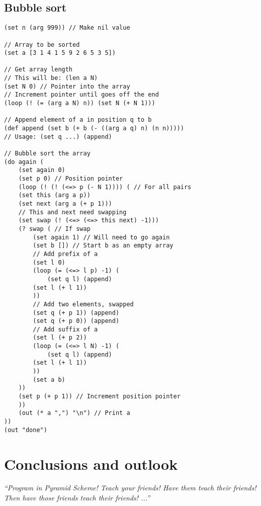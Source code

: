 \documentclass[aip,jcp,reprint,footinbib]{revtex4-1}
\begin{document}
\subsection{Bubble sort}

\begin{lstlisting}[language=psll,aboveskip=3mm,belowskip=3mm]
(set n (arg 999)) // Make nil value

// Array to be sorted
(set a [3 1 4 1 5 9 2 6 5 3 5])

// Get array length
// This will be: (len a N)
(set N 0) // Pointer into the array
// Increment pointer until goes off the end
(loop (! (= (arg a N) n)) (set N (+ N 1)))

// Append element of a in position q to b
(def append (set b (+ b (- ((arg a q) n) (n n)))))
// Usage: (set q ...) (append)

// Bubble sort the array
(do again (
    (set again 0)
    (set p 0) // Position pointer
    (loop (! (! (<=> p (- N 1)))) ( // For all pairs
    (set this (arg a p))
    (set next (arg a (+ p 1)))
    // This and next need swapping
    (set swap (! (<=> (<=> this next) -1)))
    (? swap ( // If swap
        (set again 1) // Will need to go again
        (set b []) // Start b as an empty array
        // Add prefix of a
        (set l 0)
        (loop (= (<=> l p) -1) (
            (set q l) (append)
        (set l (+ l 1))
        ))
        // Add two elements, swapped
        (set q (+ p 1)) (append)
        (set q (+ p 0)) (append)
        // Add suffix of a
        (set l (+ p 2))
        (loop (= (<=> l N) -1) (
            (set q l) (append)
        (set l (+ l 1))
        ))
        (set a b)
    ))
    (set p (+ p 1)) // Increment position pointer
    ))
    (out (* a ",") "\n") // Print a
))
(out "done")
\end{lstlisting}

\section{Conclusions and outlook}
\textit{\enquote{Program in Pyramid Scheme! Teach your friends! Have them teach \emph{their} friends! Then have those friends teach \emph{their} friends! ...}}
\end{document}
